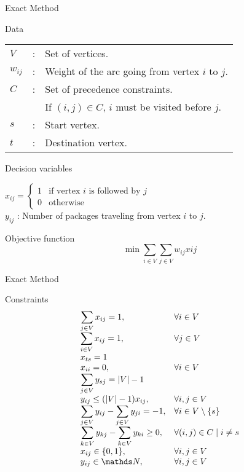 \documentclass{beamer}
\begin{document}
\begin{frame}{Exact Method}
	\begin{block}{Data}
		\begin{tabular}{lll}
			$V$ & : & Set of vertices.\\ 
			$w_{ij}$ & : & Weight of the arc going from vertex $i$ to $j$.\\
			$C$ & : & Set of precedence constraints.\\
			& & If $(i,j) \in C$, $i$ must be visited before $j$.\\
			$s$ & : & Start vertex.\\
			$t$ & : & Destination vertex.
		\end{tabular}
	\end{block}

	\begin{block}{Decision variables}
	
		$x_{ij} = \begin{cases}
			1 & \text{if vertex } i \text{ is followed by } j\\
			0 & \text{otherwise}
		\end{cases}$\\
	
		$y_{ij}$ : Number of packages traveling from vertex $i$ to $j$.
	\end{block}

	\begin{block}{Objective function}
		$$\min \sum_{i \in V}\sum_{j \in V} w_{ij} x{ij}$$
	\end{block}
\end{frame}

\begin{frame}{Exact Method}
	\begin{block}{Constraints}
		$$\begin{array}{ll}
			\displaystyle\sum_{j \in V} x_{ij} = 1, & \forall i \in V\\
			\displaystyle\sum_{i \in V} x_{ij} = 1, & \forall j \in V\\
			x_{ts} = 1 &\\
			x_{ii} = 0, & \forall i \in V\\
			\displaystyle\sum_{j \in V} y_{sj} = |V| - 1&\\
			y_{ij} \le (|V| - 1) x_{ij}, & \forall i, j \in V\\
			\displaystyle\sum_{j \in V} y_{ij} - \displaystyle\sum_{j \in V} y_{ji} = -1, & \forall i \in V\setminus\{s\}\\
			\displaystyle\sum_{k \in V} y_{kj} - \displaystyle\sum_{k \in V} y_{ki} \ge 0, & \forall (i,j) \in C \mid i \ne s\\
			x_{ij} \in \{0, 1\}, & \forall i,j \in V\\
			y_{ij} \in \N, & \forall i,j \in V\\
		\end{array}$$
	\end{block}
\end{frame}
\end{document}
